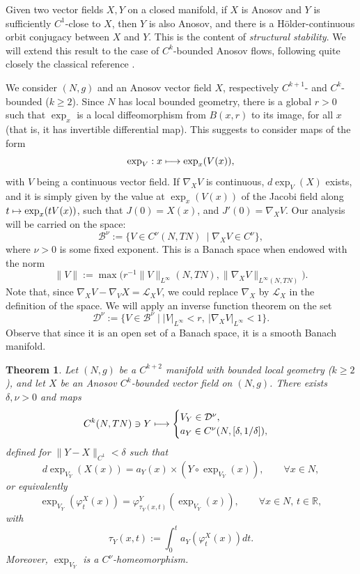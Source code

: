 \documentclass[JEP,XML,SOM,Unicode,NoFloatCountersInSection]{cedram}
\newcommand\mto{\mathchoice{\longmapsto}{\mapsto}{\mapsto}{\mapsto}}
\newcommand{\R}{\mathbb{R}}
\theoremstyle{plain}
\newtheorem{theorem}{Theorem}[section]
\theoremstyle{definition}
\begin{document}
Given two vector fields $X,Y$ on a closed manifold, if $X$ is Anosov and $Y$ is sufficiently $C^1$-close to $X$, then $Y$ is also Anosov, and there is a Hölder-continuous orbit conjugacy between $X$ and $Y$. This is the content of \emph{structural stability}. We will extend this result to the case of $C^k$-bounded Anosov flows, following quite closely the classical reference \cite[App.\,A]{DeLaLlave-Marco-Moryon-86}.

We consider $(N,g)$ and an Anosov vector field $X$, respectively $C^{k+1}$- and $C^k$-bounded ($k\geq 2$). Since $N$ has local bounded geometry, there is a global $r>0$ such that $\exp_x$ is a local diffeomorphism from $B(x,r)$ to its image, for all $x$ (that is, it has invertible differential map). This suggests to consider maps of the form
\[
\exp_V : x \mto \exp_x(V(x)),
\]
with $V$ being a continuous vector field. If $\nabla_X V$ is continuous, $d \exp_V(X)$ exists, and it is simply given by the value at $\exp_x(V(x))$ of the Jacobi field along $t\mto \exp_x(t V(x))$, such that $J(0) = X(x)$, and $J'(0) = \nabla_X V$. Our analysis will be carried on the space:
\[
\mathcal{B}^\nu :=\{ V \in C^\nu(N, TN)\ \mid \nabla_X V \in C^\nu\},
\]
where $\nu > 0$ is some fixed exponent. This is a Banach space when endowed with the norm
\[
\|V\|:=\max\bigl( r^{-1} \| V\|_{L^\infty}(N,TN), \| \nabla_X V\|_{L^\infty(N,TN)}\bigr).
\]
Note that, since $\nabla_X V - \nabla_V X = \mathcal{L}_X V$, we could replace $\nabla_X$ by $\mathcal{L}_X$ in the definition of the space. We will apply an inverse function theorem on the set
\[
\mathcal{D}^\nu:=\{V \in \mathcal{B}^\nu\mid |V|_{L^\infty} < r,\ |\nabla_X V|_{L^\infty} < 1\}.
\]
Observe that since it is an open set of a Banach space, it is a smooth Banach manifold.

\begin{theorem}\label{thm:homeo-Anosov}
Let $(N,g)$ be a $C^{k+2}$ manifold with bounded local geometry ($k\geq 2$), and let $X$ be an Anosov $C^k$-bounded vector field on $(N,g)$. There exists $\delta,\nu>0$ and maps
\[
C^{k}(N,TN)\owns Y \mto \begin{cases} V_Y\in \mathcal{D}^\nu, \\ a_Y \in C^\nu(N,[\delta, 1/\delta]),\end{cases}
\]
defined for $\| Y - X \|_{C^1} < \delta$ such that
\[
d \exp_{V_Y}(X(x)) = a_Y(x)\times( Y\circ \exp_{V_Y}(x)), \qquad \forall x \in N,
\]
or equivalently
\[
\exp_{V_Y}(\varphi^X_t( x )) = \varphi^Y_{\tau_Y(x,t)}(\exp_{V_Y}(x)), \qquad \forall x \in N,\, t \in \R,
\]
with
\[
\tau_Y(x,t) := \int_0^t a_Y(\varphi^X_t(x))dt.
\]
Moreover, $\exp_{V_Y}$ is a $C^\nu$-homeomorphism.
\end{theorem}
\end{document}
